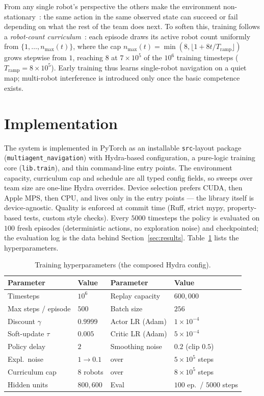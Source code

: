 \documentclass[11pt,a4paper]{article}
\newcommand{\CurriculumCap}{8}
\begin{document}
From any single robot's perspective the others make the environment
non-stationary~\cite{tan1993}: the same action in the same observed state
can succeed or fail depending on what the rest of the team does next. To
soften this, training follows a \emph{robot-count
curriculum}~\cite{bengio2009}: each episode draws its active robot count
uniformly from $\{1, \dots, n_{\max}(t)\}$, where the cap
$n_{\max}(t) = \min(8, \lfloor 1 + 8t/T_{\mathrm{ramp}} \rfloor)$ grows
stepwise from $1$, reaching \CurriculumCap{} at $7\times10^5$ of the $10^6$
training timesteps ($T_{\mathrm{ramp}} = 8\times10^5$). Early training thus
learns single-robot
navigation on a quiet map; multi-robot interference is introduced only once
the basic competence exists.

\section{Implementation}
The system is implemented in PyTorch as an installable \texttt{src}-layout
package (\texttt{multiagent\_navigation}) with Hydra-based configuration, a
pure-logic training core (\texttt{lib.train}), and thin command-line entry
points. The environment capacity, curriculum cap and schedule are all typed
config fields, so sweeps over team size are one-line Hydra overrides. Device
selection prefers CUDA, then Apple MPS, then CPU, and lives only in the entry
points — the library itself is device-agnostic. Quality is enforced at
commit time (Ruff, strict mypy, property-based tests, custom style checks).
Every $5000$ timesteps the policy is evaluated on $100$ fresh episodes
(deterministic actions, no exploration noise) and checkpointed; the
evaluation log is the data behind Section~\ref{sec:results}.
Table~\ref{tab:hp} lists the hyperparameters.

\begin{table}[H]
  \centering
  \caption{Training hyperparameters (the composed Hydra config).}
  \label{tab:hp}
  \begin{tabular}{llll}
    \toprule
    Parameter & Value & Parameter & Value\\
    \midrule
    Timesteps             & $10^6$          & Replay capacity  & $600{,}000$\\
    Max steps / episode   & $500$           & Batch size       & $256$\\
    Discount $\gamma$     & $0.9999$        & Actor LR (Adam)  & $1\!\times\!10^{-4}$\\
    Soft-update $\tau$    & $0.005$         & Critic LR (Adam) & $5\!\times\!10^{-4}$\\
    Policy delay          & $2$             & Smoothing noise  & $0.2$ (clip $0.5$)\\
    Expl.\ noise          & $1 \to 0.1$     & over             & $5\!\times\!10^5$ steps\\
    Curriculum cap        & \CurriculumCap{} robots & over     & $8\!\times\!10^5$ steps\\
    Hidden units          & $800, 600$      & Eval             & $100$ ep.\ / $5000$ steps\\
    \bottomrule
  \end{tabular}
\end{table}
\end{document}
